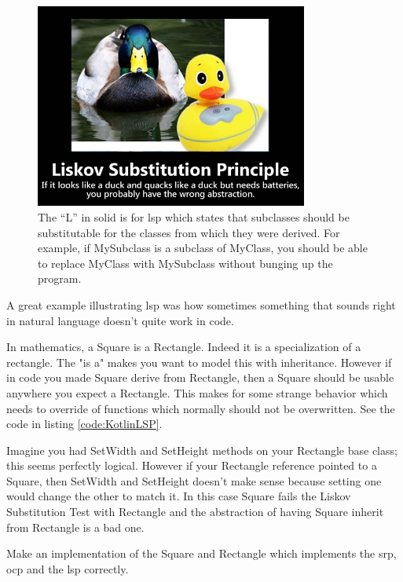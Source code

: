\begin{figure}
	\centering
	\includegraphics[width=0.8\textwidth]{images/kotlin/LSP.jpg}
	\caption{The “L” in \gls{solid} is for \gls{lsp} which states that subclasses should be substitutable for the classes from which they were derived.
		For example, if MySubclass is a subclass of MyClass, you should be able to replace MyClass with MySubclass without bunging up the program.}
	\label{fir:LSP}
\end{figure}

A great example illustrating \gls{lsp}  was how sometimes something that sounds right in natural language doesn't quite work in code.

In mathematics, a Square is a Rectangle.
Indeed it is a specialization of a rectangle.
The "is a" makes you want to model this with inheritance.
However if in code you made Square derive from Rectangle, then a Square should be usable anywhere you expect a Rectangle.
This makes for some strange behavior which needs to override of functions which normally should not be overwritten.
See the code in listing \ref{code:KotlinLSP}.



Imagine you had SetWidth and SetHeight methods on your Rectangle base class; this seems perfectly logical.
However if your Rectangle reference pointed to a Square, then SetWidth and SetHeight doesn't make sense because setting one would change the other to match it.
In this case Square fails the Liskov Substitution Test with Rectangle and the abstraction of having Square inherit from Rectangle is a bad one.

\begin{exercise}
	Make an implementation of the Square and Rectangle which implements the \gls{srp},  \gls{ocp}  and the \gls{lsp} correctly. 
\end{exercise}

